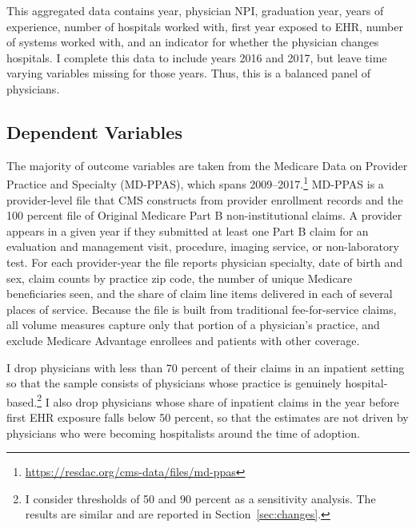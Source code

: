 \documentclass[12pt]{article}
\begin{document}
This aggregated data contains year, physician NPI, graduation year, years of experience, number of hospitals worked with, first year exposed to EHR, number of systems worked with, and an indicator for whether the physician changes hospitals. I complete this data to include years 2016 and 2017, but leave time varying variables missing for those years. Thus, this is a balanced panel of physicians.

\subsection{Dependent Variables}\label{sec:appmdppas}

The majority of outcome variables are taken from the Medicare Data on Provider
Practice and Specialty (MD-PPAS), which spans 2009--2017.\footnote{\url{https://resdac.org/cms-data/files/md-ppas}}
MD-PPAS is a provider-level file that CMS constructs from provider enrollment
records and the 100 percent file of Original Medicare Part B non-institutional
claims. A provider appears in a given year if they submitted at least one Part B
claim for an evaluation and management visit, procedure, imaging service, or
non-laboratory test. For each provider-year the file reports physician
specialty, date of birth and sex, claim counts by practice zip code, the number
of unique Medicare beneficiaries seen, and the share of claim line items
delivered in each of several places of service. Because the file is built from
traditional fee-for-service claims, all volume measures capture only that portion
of a physician's practice, and exclude Medicare Advantage enrollees and patients
with other coverage.

I drop physicians with less than 70 percent of their claims in an inpatient setting so that the sample consists of physicians whose practice is genuinely hospital-based.\footnote{I consider thresholds of 50 and 90 percent as a sensitivity analysis. The results are similar and are reported in Section~\ref{sec:changes}.} I also drop
physicians whose share of inpatient claims in the year before first EHR exposure
falls below 50 percent, so that the estimates are not driven by physicians who
were becoming hospitalists around the time of adoption.
\end{document}
